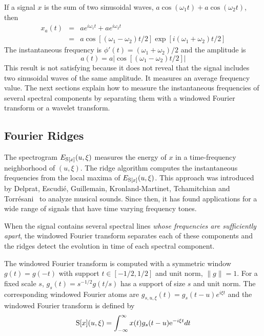 \begin{example} If a signal $x$ is the sum of two sinusoidal waves, 
$a\cos(\omega_1t) + a\cos(\omega_2t)$, then 
\begin{eqnarray*}
x_a(t)&=&a e^{i \omega_1t} + a e^{i \omega_2t}\\
&=& a\cos[ (\omega_1-\omega_2)t/2]\exp[i (\omega_1+\omega_2)t/2]
\end{eqnarray*}
The instantaneous frequency is $\phi'(t)=(\omega_1+\omega_2)/2$ and
the amplitude is 
\[
a(t)= a \left|\cos[ (\omega_1-\omega_2)t/2]\right|
\]
This result is not satisfying because it does not reveal that the
signal includes two sinusoidal waves of the same amplitude.  It
measures an average frequency value.  The next sections explain how to
measure the instantaneous frequencies of several spectral components
by separating them with a windowed Fourier transform or a wavelet
transform. 
\end{example}

{\subsection{Fourier Ridges\protect\footnotemark}
}
The spectrogram $E_{\S[x]}(u,\xi)$ measures the energy of $x$ in a
time-frequency neighborhood of $(u,\xi)$.  The ridge algorithm
computes the instantaneous frequencies from the local maxima of
$E_{\S[x]}(u,\xi)$.  This approach was introduced by Delprat, Escudi\'{e},
Guillemain, Kronland-Martinet, Tchamitchian and
Torr\'{e}sani~\cite{Delprat:1992} to analyze musical sounds.  Since
then, it has found applications for a wide range of signals that have
time varying frequency tones.

When the signal contains several spectral lines \emph{whose
frequencies are sufficiently apart}, the windowed Fourier transform
separates each of these components and the ridges detect the evolution
in time of each spectral component.

The windowed Fourier transform is computed with a symmetric window
$g(t)=g(-t)$ with support $t\in[-1/2,1/2]$ and unit norm, $\|g\|=1$.  
For a fixed scale $s$, $g_s(t)=s^{-1/2}g(t/s)$ has a support of size
$s$ and unit norm.  The corresponding windowed Fourier atoms are 
$g_{s,u,\xi}(t)=g_s(t-u)e^{i \xi t}$
and the windowed Fourier transform is defined by 
\[
\S[x](u,\xi) =\integral x(t)g_s(t-u)\e^{-i \xi t}dt
\]

